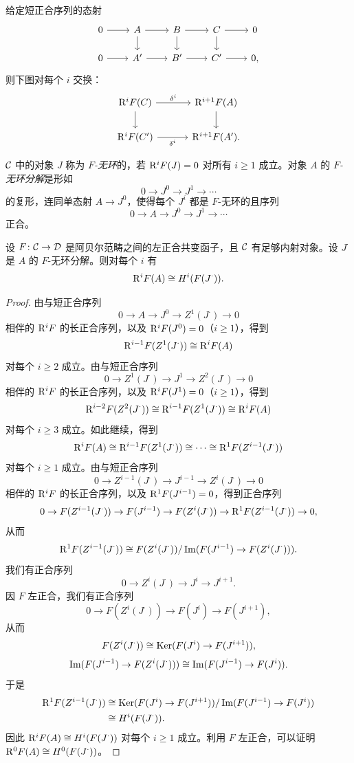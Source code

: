 给定短正合序列的态射
\[\begin{tikzcd}[column sep=2.2em,row sep=1.5em]
0 \arrow[r] & A \arrow[r] \arrow[d] & B \arrow[r] \arrow[d] & C \arrow[r] \arrow[d] & 0 \\
0 \arrow[r] & A' \arrow[r] & B' \arrow[r] & C' \arrow[r] & 0,
\end{tikzcd}\]
则下图对每个 $i$ 交换：
\[\begin{tikzcd}[column sep=3.2em,row sep=1.8em]
\R^iF(C) \arrow[r,"\delta^i"] \arrow[d] & \R^{i+1}F(A) \arrow[d] \\
\R^iF(C') \arrow[r,"\delta^i"'] & \R^{i+1}F(A').
\end{tikzcd}\]

$\mathcal{C}$ 中的对象 $J$ 称为 \emph{$F$-无环}的，若 $\mathrm{R}^iF(J)=0$ 对所有 $i\ge1$ 成立。对象 $A$ 的 \emph{$F$-无环分解}是形如
\[
0\to J^0\to J^1\to\cdots
\]
的复形，连同单态射 $A\to J^0$，使得每个 $J^i$ 都是 $F$-无环的且序列
\[
0\to A\to J^0\to J^1\to\cdots
\]
正合。

\begin{proposition}\label{it:2.1.2}
设 $F\colon\mathcal{C}\to\mathcal{D}$ 是阿贝尔范畴之间的左正合共变函子，且 $\mathcal{C}$ 有足够内射对象。设 $J^\cdot$ 是 $A$ 的 $F$-无环分解。则对每个 $i$ 有
\[
\mathrm{R}^iF(A)\cong H^i(F(J^\cdot)).
\]
\end{proposition}
\begin{proof}
由与短正合序列
\[
0\to A\to J^0\to Z^1(J^\cdot)\to 0
\]
相伴的 $\mathrm{R}^iF$ 的长正合序列，以及 $\mathrm{R}^iF(J^0)=0$（$i\ge1$），得到
\[
\mathrm{R}^{i-1}F(Z^1(J^\cdot))\cong\mathrm{R}^iF(A)
\]
对每个 $i\ge2$ 成立。由与短正合序列
\[
0\to Z^1(J^\cdot)\to J^1\to Z^2(J^\cdot)\to 0
\]
相伴的 $\mathrm{R}^iF$ 的长正合序列，以及 $\mathrm{R}^iF(J^1)=0$（$i\ge1$），得到
\[
\mathrm{R}^{i-2}F(Z^2(J^\cdot))\cong\mathrm{R}^{i-1}F(Z^1(J^\cdot))\cong\mathrm{R}^iF(A)
\]
对每个 $i\ge3$ 成立。如此继续，得到
\[
\mathrm{R}^iF(A)\cong\mathrm{R}^{i-1}F(Z^1(J^\cdot))\cong\cdots\cong\mathrm{R}^1F(Z^{i-1}(J^\cdot))
\]
对每个 $i\ge1$ 成立。由与短正合序列
\[
0\to Z^{i-1}(J^\cdot)\to J^{i-1}\to Z^i(J^\cdot)\to 0
\]
相伴的 $\mathrm{R}^iF$ 的长正合序列，以及 $\mathrm{R}^1F(J^{i-1})=0$，得到正合序列
\[
0\to F(Z^{i-1}(J^\cdot))\to F(J^{i-1})\to F(Z^i(J^\cdot))\to\mathrm{R}^1F(Z^{i-1}(J^\cdot))\to 0,
\]
从而
\[
\mathrm{R}^1F(Z^{i-1}(J^\cdot))\cong F(Z^i(J^\cdot))/\operatorname{Im}(F(J^{i-1})\to F(Z^i(J^\cdot))).
\]
我们有正合序列
\[
0\to Z^i(J^\cdot)\to J^i\to J^{i+1}.
\]
因 $F$ 左正合，我们有正合序列
\[
0\to F(Z^i(J^\cdot))\to F(J^i)\to F(J^{i+1}),
\]
从而
\[
F(Z^i(J^\cdot))\cong\operatorname{Ker}(F(J^i)\to F(J^{i+1})),
\]
\[
\operatorname{Im}(F(J^{i-1})\to F(Z^i(J^\cdot)))\cong\operatorname{Im}(F(J^{i-1})\to F(J^i)).
\]
于是
\[
\begin{aligned}
\mathrm{R}^1F(Z^{i-1}(J^\cdot))&\cong\operatorname{Ker}(F(J^i)\to F(J^{i+1}))/\operatorname{Im}(F(J^{i-1})\to F(J^i))\\
&\cong H^i(F(J^\cdot)).
\end{aligned}
\]
因此 $\mathrm{R}^iF(A)\cong H^i(F(J^\cdot))$ 对每个 $i\ge1$ 成立。利用 $F$ 左正合，可以证明 $\mathrm{R}^0F(A)\cong H^0(F(J^\cdot))$。
\end{proof}

